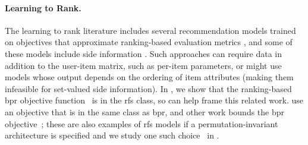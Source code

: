 \paragraph{Learning to Rank.} The learning to rank literature includes several recommendation models trained on objectives that approximate ranking-based evaluation metrics \citep{yu2018walkranker-fixed,liang2018top-n-rank:,rendle2009bpr:,song2018neural}, and some of these models include side information \citep{shi2012tfmap:,shi2012climf:,yuan2016optimizing,ying2016collaborative,cao2017embedding,okura2017embedding-based}. Such approaches can require data in addition to the user-item matrix, such as per-item parameters, or might use models whose output depends on the ordering of item attributes (making them infeasible for set-valued side information). In , we show that the ranking-based \gls{bpr} objective function~\citep{rendle2009bpr:,kula2015metadata} is in the \gls{rfs} class, so  can help frame this related work. \citet{li2016a-relaxed} use an objective that is in the same class as \gls{bpr}, and other work bounds the \gls{bpr} objective~\citep{zhang2018discrete-deep}; these are also examples of \gls{rfs} models if a permutation-invariant architecture is specified and we study one such choice~\citep{kula2015metadata} in .
